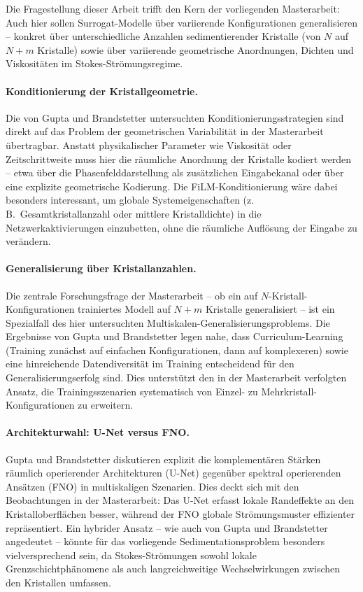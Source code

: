 \documentclass[a4paper,12pt]{article}
\begin{document}
Die Fragestellung dieser Arbeit trifft den Kern der vorliegenden Masterarbeit: Auch hier sollen Surrogat-Modelle über variierende Konfigurationen generalisieren -- konkret über unterschiedliche Anzahlen sedimentierender Kristalle (von $N$ auf $N+m$ Kristalle) sowie über variierende geometrische Anordnungen, Dichten und Viskositäten im Stokes-Strömungsregime.

\paragraph{Konditionierung der Kristallgeometrie.}
Die von Gupta und Brandstetter untersuchten Konditionierungsstrategien sind direkt auf das Problem der geometrischen Variabilität in der Masterarbeit übertragbar. Anstatt physikalischer Parameter wie Viskosität oder Zeitschrittweite muss hier die räumliche Anordnung der Kristalle kodiert werden -- etwa über die Phasenfelddarstellung als zusätzlichen Eingabekanal oder über eine explizite geometrische Kodierung. Die FiLM-Konditionierung wäre dabei besonders interessant, um globale Systemeigenschaften (z.\,B.\ Gesamtkristallanzahl oder mittlere Kristalldichte) in die Netzwerkaktivierungen einzubetten, ohne die räumliche Auflösung der Eingabe zu verändern.

\paragraph{Generalisierung über Kristallanzahlen.}
Die zentrale Forschungsfrage der Masterarbeit -- ob ein auf $N$-Kristall-Konfigurationen trainiertes Modell auf $N+m$ Kristalle generalisiert -- ist ein Spezialfall des hier untersuchten Multiskalen-Generalisierungsproblems. Die Ergebnisse von Gupta und Brandstetter legen nahe, dass Curriculum-Learning (Training zunächst auf einfachen Konfigurationen, dann auf komplexeren) sowie eine hinreichende Datendiversität im Training entscheidend für den Generalisierungserfolg sind. Dies unterstützt den in der Masterarbeit verfolgten Ansatz, die Trainingsszenarien systematisch von Einzel- zu Mehrkristall-Konfigurationen zu erweitern.

\paragraph{Architekturwahl: U-Net versus FNO.}
Gupta und Brandstetter diskutieren explizit die komplementären Stärken räumlich operierender Architekturen (U-Net) gegenüber spektral operierenden Ansätzen (FNO) in multiskaligen Szenarien. Dies deckt sich mit den Beobachtungen in der Masterarbeit: Das U-Net erfasst lokale Randeffekte an den Kristalloberflächen besser, während der FNO globale Strömungsmuster effizienter repräsentiert. Ein hybrider Ansatz -- wie auch von Gupta und Brandstetter angedeutet -- könnte für das vorliegende Sedimentationsproblem besonders vielversprechend sein, da Stokes-Strömungen sowohl lokale Grenzschichtphänomene als auch langreichweitige Wechselwirkungen zwischen den Kristallen umfassen.
\end{document}

